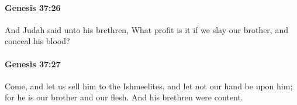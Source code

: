 		\paragraph{Genesis 37:26} %
			\label{GENESIS-37-26}

			And Judah said unto his brethren, What profit is it if we slay our brother, and conceal his blood?


		\paragraph{Genesis 37:27} %
			\label{GENESIS-37-27}

			Come, and let us sell him to the Ishmeelites, and let not our hand be upon him; for he is our brother and our flesh. And his brethren were content.



